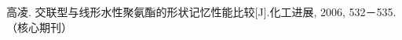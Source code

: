 
\begin{publications}{99}

  \item\textsc{高凌}. {交联型与线形水性聚氨酯的形状记忆性能比较}[J].化工进展, 2006, 532－535.（核心期刊）

\end{publications}
